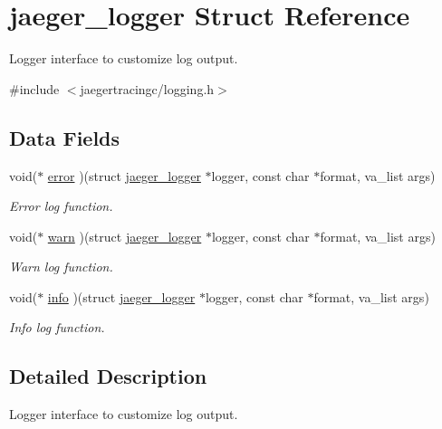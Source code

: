 \hypertarget{structjaeger__logger}{}\section{jaeger\+\_\+logger Struct Reference}
\label{structjaeger__logger}


Logger interface to customize log output.  




{\ttfamily \#include $<$jaegertracingc/logging.\+h$>$}

\subsection*{Data Fields}
\begin{DoxyCompactItemize}
\item 
void($\ast$ \mbox{\hyperlink{structjaeger__logger_a41a2e4729ee8379193fe61dd5113bda6}{error}} )(struct \mbox{\hyperlink{structjaeger__logger}{jaeger\+\_\+logger}} $\ast$logger, const char $\ast$format, va\+\_\+list args)
\begin{DoxyCompactList}\small\item\em Error log function. \end{DoxyCompactList}\item 
void($\ast$ \mbox{\hyperlink{structjaeger__logger_a92ed10ab8a9826819eca22027258ae16}{warn}} )(struct \mbox{\hyperlink{structjaeger__logger}{jaeger\+\_\+logger}} $\ast$logger, const char $\ast$format, va\+\_\+list args)
\begin{DoxyCompactList}\small\item\em Warn log function. \end{DoxyCompactList}\item 
void($\ast$ \mbox{\hyperlink{structjaeger__logger_af6b893184914a085c831e26f10c2b4c6}{info}} )(struct \mbox{\hyperlink{structjaeger__logger}{jaeger\+\_\+logger}} $\ast$logger, const char $\ast$format, va\+\_\+list args)
\begin{DoxyCompactList}\small\item\em Info log function. \end{DoxyCompactList}\end{DoxyCompactItemize}


\subsection{Detailed Description}
Logger interface to customize log output. 



